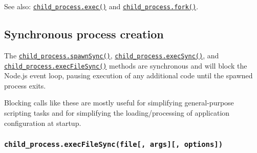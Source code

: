 See also:
\hyperref[child_processexeccommand-options-callback]{\texttt{child\_process.exec()}}
and
\hyperref[child_processforkmodulepath-args-options]{\texttt{child\_process.fork()}}.

\subsection{Synchronous process
creation}\label{synchronous-process-creation}

The
\hyperref[child_processspawnsynccommand-args-options]{\texttt{child\_process.spawnSync()}},
\hyperref[child_processexecsynccommand-options]{\texttt{child\_process.execSync()}},
and
\hyperref[child_processexecfilesyncfile-args-options]{\texttt{child\_process.execFileSync()}}
methods are synchronous and will block the Node.js event loop, pausing
execution of any additional code until the spawned process exits.

Blocking calls like these are mostly useful for simplifying
general-purpose scripting tasks and for simplifying the
loading/processing of application configuration at startup.

\subsubsection{\texorpdfstring{\texttt{child\_process.execFileSync(file{[},\ args{]}{[},\ options{]})}}{child\_process.execFileSync(file{[}, args{]}{[}, options{]})}}\label{child_process.execfilesyncfile-args-options}

